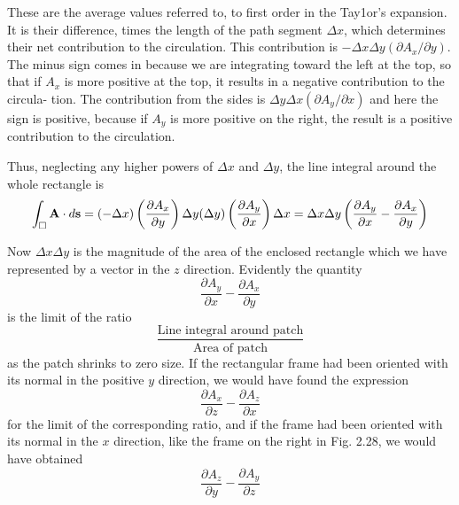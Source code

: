 These are the average values referred to, to first order in the Tay1or's
expansion. It is their difference, times the length of the path segment
$\Delta x$, which determines their net contribution to the circulation. This
contribution is $- \Delta x \Delta y (\partial A_x/\partial y)$. The minus sign comes in because
we are integrating toward the left at the top, so that if $A_x$ is more
positive at the top, it results in a negative contribution to the circula-
tion. The contribution from the sides is $\Delta y \Delta x (\partial A_y/\partial x)$ and here
the sign is positive, because if $A_y$ is more positive on the right, the
result is a positive contribution to the circulation.


Thus, neglecting any higher powers of $\Delta x$ and $\Delta y$, the line integral
around the whole rectangle is
\begin{equation}
  \int_\Box \mathbf{A}\cdot d\mathbf{s} = (-\Delta x)\left(\frac{\partial A_x}{\partial y}\right)\Delta y
                (\Delta y)\left(\frac{\partial A_y}{\partial x}\right)\Delta x
    = \Delta x \Delta y\left(\frac{\partial A_y}{\partial x}-\frac{\partial A_x}{\partial y}\right)
\end{equation}

Now $\Delta x \Delta y$ is the magnitude of the area of the enclosed rectangle
which we have represented by a vector in the $z$ direction. Evidently
the quantity
\begin{equation}
  \frac{\partial A_y}{\partial x}-\frac{\partial A_x}{\partial y}
\end{equation}
is the limit of the ratio
\begin{equation}
  \frac{\text{Line integral around patch}}{\text{Area of patch}}
\end{equation}
as the patch shrinks to zero size. If the rectangular frame had been
oriented with its normal in the positive $y$ direction, we would have
found the expression
\begin{equation}
  \frac{\partial A_x}{\partial z}-\frac{\partial A_z}{\partial x}
\end{equation}
for the limit of the corresponding ratio, and if the frame had been
oriented with its normal in the $x$ direction, like the frame on the right
in Fig. 2.28, we would have obtained
\begin{equation}
  \frac{\partial A_z}{\partial y}-\frac{\partial A_y}{\partial z}
\end{equation}

